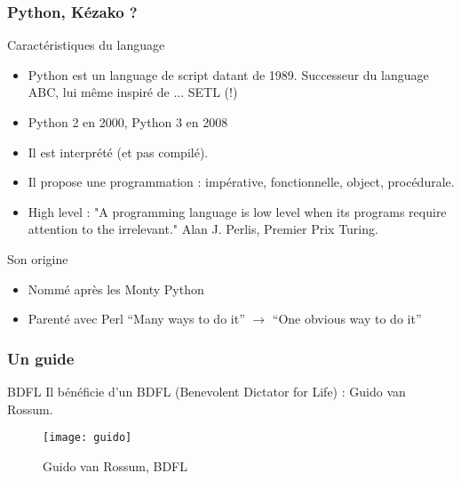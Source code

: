 \documentclass{beamer}
\begin{document}
\begin{frame}
  \frametitle{Python, Kézako ?}

  
  \begin{block}{Caractéristiques du language}
    \begin{itemize}
    \item Python est un language de script datant de 1989. Successeur du
      language ABC, lui même inspiré de ... SETL (!)
    \item Python 2 en 2000, Python 3 en 2008
    \item Il est interprété (et pas compilé).
    \item Il propose une programmation : impérative, fonctionnelle,
      object, procédurale.
    \item High level :  "A programming language is low level when its
      programs require attention to the irrelevant." Alan J. Perlis,
      Premier Prix Turing.
    \end{itemize}
  \end{block}

  \begin{block}{Son origine}
    \begin{itemize}
    \item Nommé après les Monty Python
    \item Parenté avec Perl ``Many ways to do it'' $\rightarrow$ ``One
      obvious way to do it''
    \end{itemize}
  \end{block}
  
\end{frame}

\begin{frame}
  \frametitle{Un guide}

  \begin{block}{BDFL}
    Il bénéficie d'un BDFL (Benevolent Dictator for Life) : Guido van
    Rossum.  
  \end{block}
  
  \begin{figure}[H]
    \centering
    \texttt{[image: guido]}
    \caption{Guido van Rossum, BDFL}
    \label{fig:guido}
  \end{figure}


\end{frame}
\end{document}
